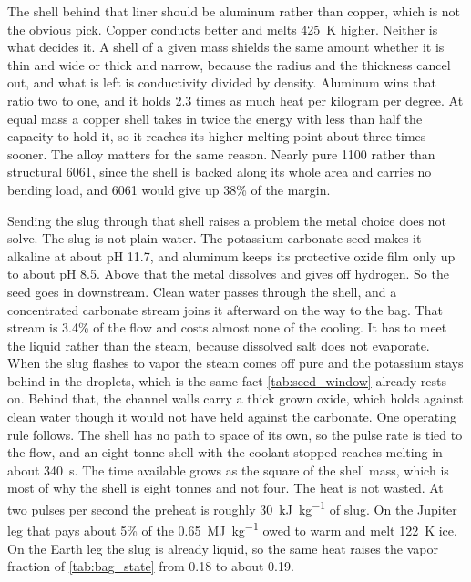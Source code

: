 \documentclass{article}
\begin{document}
The shell behind that liner should be aluminum rather than copper, which is not the obvious pick. Copper conducts better and melts \SI{425}{\kelvin} higher. Neither is what decides it. A shell of a given mass shields the same amount whether it is thin and wide or thick and narrow, because the radius and the thickness cancel out, and what is left is conductivity divided by density. Aluminum wins that ratio two to one, and it holds 2.3 times as much heat per kilogram per degree. At equal mass a copper shell takes in twice the energy with less than half the capacity to hold it, so it reaches its higher melting point about three times sooner. The alloy matters for the same reason. Nearly pure 1100 rather than structural 6061, since the shell is backed along its whole area and carries no bending load, and 6061 would give up 38\% of the margin.

Sending the slug through that shell raises a problem the metal choice does not solve. The slug is not plain water. The potassium carbonate seed makes it alkaline at about pH 11.7, and aluminum keeps its protective oxide film only up to about pH 8.5. Above that the metal dissolves and gives off hydrogen. So the seed goes in downstream. Clean water passes through the shell, and a concentrated carbonate stream joins it afterward on the way to the bag. That stream is 3.4\% of the flow and costs almost none of the cooling. It has to meet the liquid rather than the steam, because dissolved salt does not evaporate. When the slug flashes to vapor the steam comes off pure and the potassium stays behind in the droplets, which is the same fact \autoref{tab:seed_window} already rests on. Behind that, the channel walls carry a thick grown oxide, which holds against clean water though it would not have held against the carbonate. One operating rule follows. The shell has no path to space of its own, so the pulse rate is tied to the flow, and an eight tonne shell with the coolant stopped reaches melting in about \SI{340}{\second}. The time available grows as the square of the shell mass, which is most of why the shell is eight tonnes and not four. The heat is not wasted. At two pulses per second the preheat is roughly \SI{30}{\kilo\joule\per\kilogram} of slug. On the Jupiter leg that pays about 5\% of the \SI{0.65}{\mega\joule\per\kilogram} owed to warm and melt \SI{122}{\kelvin} ice. On the Earth leg the slug is already liquid, so the same heat raises the vapor fraction of \autoref{tab:bag_state} from \num{0.18} to about \num{0.19}.
\end{document}

